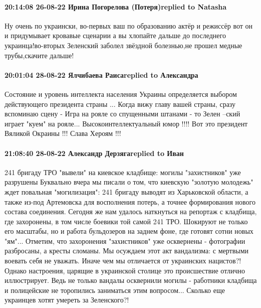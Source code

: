 \paragraph{20:14:08 26-08-22 Ирина Погорелова (Потеря)replied to Natasha}

Ну очень по украински, во-первых ваш по образованию актёр и режиссёр вот он и
придумывает кровавые сценарии а вы хлопайте дальше до последнего
украинца!во-вторых Зеленский заболел звёздной болезнью,не прошел медные
трубы,скачите дальше!

\paragraph{20:01:04 28-08-22 Ялчибаева Раисаreplied to Александра}

Состояние и уровень интеллекта населения Украины определяется выбором действующего президента страны ...
Когда вижу главу вашей страны, сразу вспоминаю сцену - Игра на рояле со спущенными штанами - то Зелен --ский играет "куем" на рояле...
Высокоинтеллектуальный юмор !!!!
Вот это президент Вяликой Окраины !!!
Слава Хероям !!!

\paragraph{21:08:40 28-08-22 Александр Дерзягаreplied to Иван}

241 бригаду ТРО "вывели" на киевское кладбище: могилы "захистников" уже разрушены
Буквально вчера мы писали о том, что киевскую "золотую молодежь" ждет повальная "могилизация": 241 бригаду выводят из Харьковской области, а также из-под Артемовска для восполнения потерь, а точнее формирования нового состава соединения.
Сегодня же нам удалось наткнуться на репортаж с кладбища, где захоронены, в том числе боевики той самой 241 ТРО. Шокируют не только его масштабы, но и работа бульдозеров на заднем фоне, где готовят сотни новых "ям"...
Отметим, что захоронения "захистников" уже осквернены - фотографии разбросаны, а кресты сломаны. Мы осуждаем этот акт вандализма: с мертвыми воевать себя не уважать. Иначе чем мы отличается от украинских нацистов?!
Однако настроения, царящие в украинской столице это происшествие отлично иллюстрирует. Ведь не только вандалы осквернили могилы - работники кладбища и полицейские не торопились заниматься этим вопросом...
Сколько еще украинцев хотят умереть за Зеленского?!


